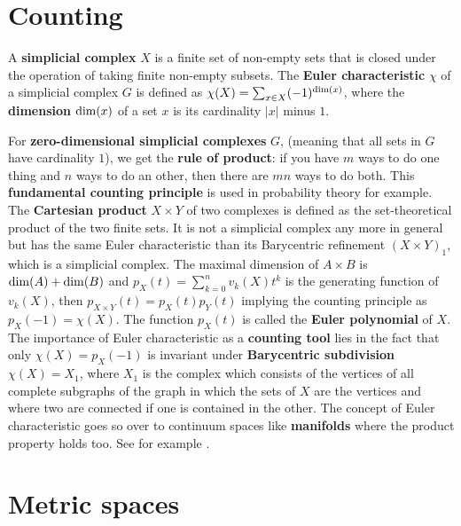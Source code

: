 \documentclass[12pt]{amsart}
\def\satz#1{ \vspace{2mm} \begin{center} \fcolorbox{yellow1}{yellow1}{ \parbox{14.0cm}{{\bf Theorem:} #1}} \vspace{2mm} \end{center} }
\newcounter{example}    \def\example#1{ \item \fontsize{12}{15} \selectfont #1 \fontsize{12}{15} \selectfont }
\begin{document}
\section{Counting}

A {\bf simplicial complex} $X$ is a finite set of non-empty sets that is closed under the operation
of taking finite non-empty subsets. The {\bf Euler characteristic} $\chi$ of a simplicial complex 
$G$ is defined as $\chi(X)=\sum_{x \in X} (-1)^{{\rm dim}(x)}$, where the {\bf dimension} 
${\rm dim}(x)$ of a set $x$ is its cardinality $|x|$ minus $1$. 

\satz{
$\chi(X \times Y) = \chi(X) \chi(Y)$.
}

For {\bf zero-dimensional simplicial complexes} $G$, (meaning that all sets in $G$ have cardinality $1$), 
we get the {\bf rule of product}: if you have $m$ ways to do 
one thing and $n$ ways to do an other, then there are $m n$ 
ways to do both. This {\bf fundamental counting principle} is used in 
probability theory for example. 
The {\bf Cartesian product} $X \times Y$ of two complexes is defined as the set-theoretical product of the 
two finite sets. It is not a simplicial complex any more in general but has the same Euler characteristic 
than its Barycentric refinement $(X \times Y)_1$, which is a simplicial complex. 
The maximal dimension of $A \times B$ is ${\rm dim}(A) + {\rm dim}(B)$ and $p_X(t) = \sum_{k=0}^n v_k(X) t^k$ 
is the generating function of $v_k(X)$, then $p_{X \times Y}(t) = p_X(t) p_Y(t)$ implying the counting principle as $p_X(-1) = \chi(X)$. 
The function $p_X(t)$ is called the {\bf Euler polynomial} of $X$. 
The importance of Euler characteristic as a {\bf counting tool}
lies in the fact that only $\chi(X)=p_X(-1)$ is invariant under 
{\bf Barycentric subdivision} $\chi(X)=X_1$, where $X_1$ is the complex which consists of
the vertices of all complete subgraphs of the graph in which the sets of $X$ are the vertices
and where two are connected if one is contained in the other. The concept of Euler characteristic goes so over
to continuum spaces like {\bf manifolds} where the product property holds too. 
See for example \cite{alexandroff}. 


\section{Metric spaces}
\end{document}
